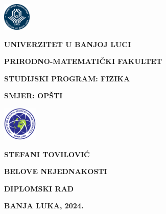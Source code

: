 \begin{titlepage}
    \begin{minipage}[t][0.33\textheight][t]{\textwidth}
        \centering
         \begin{minipage}{0.125\textwidth}
          \centering
          \includegraphics{figures/uni_logo.png} %
      \end{minipage}
      \hspace{0.5cm}
      \parbox{0.5\textwidth}{%
        \centering
        {\textbf{UNIVERZITET U BANJOJ LUCI} \par}
        {\textbf{PRIRODNO-MATEMATIČKI FAKULTET} \par}
        {\textbf{STUDIJSKI PROGRAM: FIZIKA} \par}
        {\textbf{SMJER: OPŠTI} \par}
      }
      \hspace{0.5cm}
      \begin{minipage}{0.125\textwidth}
          \centering
          \includegraphics{figures/pmf_logo.png} %
      \end{minipage}
      \end{minipage}
      
      \vfill %
      
      \begin{minipage}[t][0.33\textheight][c]{\textwidth}
        \centering
        {\textbf{STEFANI TOVILOVIĆ} \par}
        
    \vspace{1cm}

        {\Large \textbf{BELOVE NEJEDNAKOSTI}}
    
    \vspace{1cm}

        
        { \textbf{DIPLOMSKI RAD} \par}
      \end{minipage}
      
      \vfill %
      
      \begin{minipage}[t][0.33\textheight][b]{\textwidth}
        \centering
        {\large \textbf{BANJA LUKA, 2024.} \par}
      \end{minipage}

\end{titlepage}

